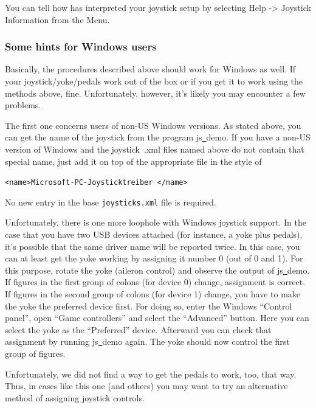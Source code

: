 You can tell how \FlightGear{} has interpreted your joystick setup by selecting
Help -> Joystick Information from the Menu.

\subsubsection{Some hints for Windows users\label{joyxp}}
Basically, the procedures described above should work for Windows as well. If your joystick/yoke/pedals work out of the box or if you get it to work using the methods above, fine. Unfortunately, however, it's likely you may encounter a few problems.

The first one concerns users of non-US Windows versions. As stated above, you can get the name of the joystick from the program js\underline{~}demo. If you have a non-US version of Windows and the joystick~.xml files named above do not contain that special name, just add it on top of the appropriate file in the style of
\medskip

 \texttt{<name>Microsoft-PC-Joysticktreiber </name>}
 \medskip

\noindent
No new entry in the base \texttt{joysticks.xml} file is required.

Unfortunately, there is one more loophole with Windows joystick support. In the case that you have two USB devices attached (for instance, a yoke plus pedals), it's possible that the same driver name will be reported twice. In this
case, you can at least get the yoke working by assigning it number 0 (out of
0 and 1). For this purpose, rotate the yoke (aileron control) and observe
the output of js\underline{~}demo. If figures in the first group of colons
(for device 0) change, assignment is correct. If figures in the second group
of colons (for device 1) change, you have to make the yoke the preferred
device first. For doing so, enter the
Windows ``Control panel'', open ``Game controllers'' and select the
``Advanced'' button. Here you can select the yoke as the ``Preferred''
device. Afterward you can check that assignment by running
js\underline{~}demo again. The yoke should now control the first group of
figures.

Unfortunately, we did not find a way to get the pedals to work, too, that way. Thus, in cases like this one (and others) you may want to try an alternative method of assigning joystick controls.

